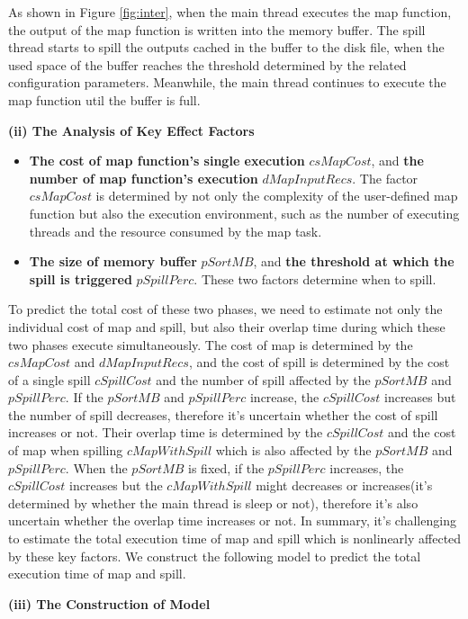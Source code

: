 As shown in Figure \ref{fig:inter}, when the main thread executes the map function, the output of the map function is written into the memory buffer. The spill thread starts to spill the outputs cached in the buffer to the disk file, when the used space of the buffer reaches the threshold determined by the related configuration parameters. Meanwhile, the main thread continues to execute the map function util the buffer is full. 

\noindent\textbf{(ii) The Analysis of Key Effect Factors}
\begin{itemize}
\item  \textbf{The cost of map function's single execution} $csMapCost$, and \textbf{the number of map function's execution} $dMapInputRecs$. The factor $csMapCost$ is determined by not only the complexity of the user-defined map function but also the execution environment, such as the number of executing threads and the resource consumed by the map task.
\item  \textbf{The size of memory buffer} $pSortMB$, and \textbf{the threshold at which the spill is triggered} $pSpillPerc$. These two factors determine when to spill.
\end{itemize}

To predict the total cost of these two phases, we need to estimate not only the individual cost of map and spill, but also their overlap time during which these two phases execute simultaneously. The cost of map is determined by the $csMapCost$ and $dMapInputRecs$, and the cost of spill is determined by the cost of a single spill $cSpillCost$ and the number of spill affected by the $pSortMB$ and $pSpillPerc$. If the $pSortMB$ and $pSpillPerc$ increase, the $cSpillCost$ increases but the number of spill decreases, therefore it's uncertain whether the cost of spill increases or not. Their overlap time is determined by the $cSpillCost$ and the cost of map when spilling $cMapWithSpill$ which is also affected by the $pSortMB$ and $pSpillPerc$. When the $pSortMB$ is fixed, if the $pSpillPerc$ increases, the $cSpillCost$ increases but the $cMapWithSpill$ might decreases or increases(it's determined by whether the main thread is sleep or not), therefore it's also uncertain whether the overlap time increases or not. In summary, it's challenging to estimate the total execution time of map and spill which is nonlinearly affected by these key factors. We construct the following model to predict the total execution time of map and spill.


\noindent\textbf{(iii) The Construction of Model}

